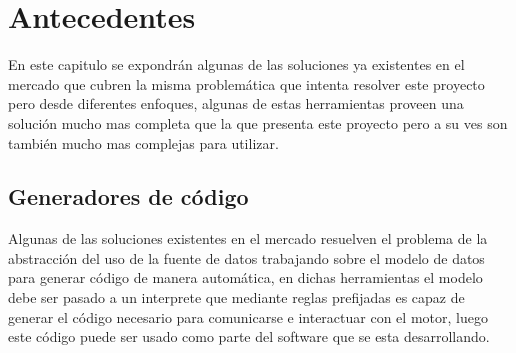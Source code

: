 \chapter{Antecedentes}
En este capitulo se expondrán algunas de las soluciones ya existentes en el mercado que cubren la misma problemática que intenta resolver este proyecto pero desde diferentes enfoques, algunas de estas herramientas proveen una solución mucho mas completa que la que presenta este proyecto pero a su ves son también mucho mas complejas para utilizar.
%
%
\section{Generadores de código}
Algunas de las soluciones existentes en el mercado resuelven el problema de la abstracción del uso de la fuente de datos trabajando sobre el modelo de datos para generar código de manera automática, en dichas herramientas el modelo debe ser pasado a un interprete que mediante reglas prefijadas es capaz de generar el código necesario para comunicarse e interactuar con el motor, luego este código puede ser usado como parte del software que se esta desarrollando.


